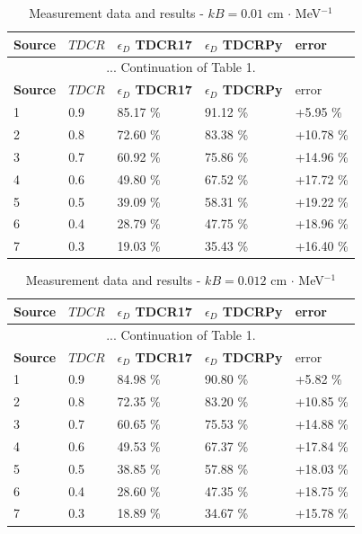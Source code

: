 \documentclass[12pt]{iopart}
\begin{document}
\begingroup
\footnotesize
\begin{longtable}[l]{| p{} | p{} | p{} |p{} |p{} |} 
\caption{Measurement data and results - $kB = 0.01$ cm $\cdot$ MeV$^{-1}$}
\label{Table1} \\ 
\hline
\textbf{Source} & \textbf{$TDCR$} & \textbf{$\epsilon_{D}$ TDCR17} & \textbf{$\epsilon_{D}$ TDCRPy} & error \\ 
\endfirsthead
\multicolumn{5}{c}{... Continuation of Table 1.}\\ 
\hline
 \textbf{Source} & \textbf{$TDCR$} & \textbf{$\epsilon_{D}$ TDCR17} & \textbf{$\epsilon_{D}$ TDCRPy} & error \\   \hline 
\endhead
\hline
 1 &  0.9  & 85.17 \% &  91.12 \% &  +5.95 \% \\
 2 &  0.8  & 72.60 \% &  83.38 \% &  +10.78 \% \\
 3 &  0.7  & 60.92 \% &  75.86 \% &  +14.96 \% \\
 4 &  0.6  & 49.80 \% &  67.52 \% &  +17.72 \% \\
 5 &  0.5  & 39.09 \% &  58.31 \% &  +19.22 \% \\
 6 &  0.4  & 28.79 \% &  47.75 \% &  +18.96 \% \\
 7 &  0.3  & 19.03 \% &  35.43 \% &  +16.40 \% \\
\hline
\end{longtable} 
\endgroup

\begingroup
\footnotesize
\begin{longtable}[l]{| p{} | p{} |p{} |p{} |p{} |} 
\caption{Measurement data and results - $kB = 0.012$ cm $\cdot$ MeV$^{-1}$}
\label{Table1} \\ 
\hline
\textbf{Source} & \textbf{$TDCR$} & \textbf{$\epsilon_{D}$ TDCR17} & \textbf{$\epsilon_{D}$ TDCRPy} & error \\ 
\endfirsthead
\multicolumn{5}{c}{... Continuation of Table 1.}\\ 
\hline
 \textbf{Source} & \textbf{$TDCR$} & \textbf{$\epsilon_{D}$ TDCR17} & \textbf{$\epsilon_{D}$ TDCRPy} & error \\   \hline 
\endhead
\hline
 1 & 0.9   &  84.98 \% &  90.80 \% & +5.82 \% \\
 2 & 0.8   &  72.35 \% &  83.20 \% & +10.85 \% \\
 3 & 0.7   &  60.65 \% &  75.53 \% & +14.88 \% \\
 4 & 0.6   &  49.53 \% &  67.37 \% & +17.84 \% \\
 5 & 0.5   &  38.85 \% &  57.88 \% & +18.03 \% \\
 6 & 0.4   &  28.60 \% &  47.35 \% & +18.75 \% \\
 7 & 0.3   &  18.89 \% &  34.67 \% & +15.78 \% \\
\hline
\end{longtable} 
\endgroup
\end{document}
